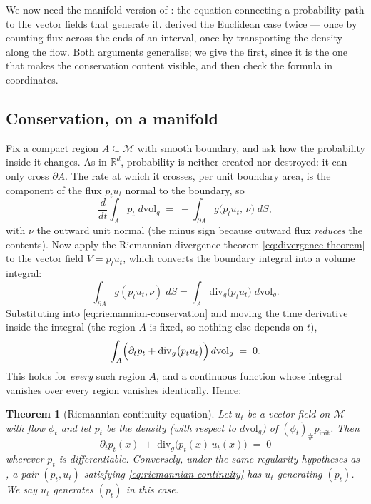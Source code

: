 \documentclass[11pt,a4paper]{report}
\newtheorem{theorem}{Theorem}[chapter]
\theoremstyle{definition}
\theoremstyle{remark}
\newcommand{\RR}{\mathbb R}
\begin{document}
We now need the manifold version of : the equation
connecting a probability path to the vector fields that generate it.
 derived the Euclidean case twice --- once by
counting flux across the ends of an interval, once by transporting the
density along the flow. Both arguments generalise; we give the first, since
it is the one that makes the conservation content visible, and then check
the formula in coordinates.

\subsection{Conservation, on a manifold}

Fix a compact region $A\subseteq\mathcal M$ with smooth boundary, and ask
how the probability inside it changes. As in $\RR^d$, probability is neither
created nor destroyed: it can only cross $\partial A$. The rate at which it
crosses, per unit boundary area, is the component of the flux $p_tu_t$
normal to the boundary, so
\begin{equation}
\label{eq:riemannian-conservation}
\frac{d}{dt}\int_A p_t\;d\mathrm{vol}_g
\;=\;
-\int_{\partial A}g\bigl(p_tu_t,\,\nu\bigr)\;dS ,
\end{equation}
with $\nu$ the outward unit normal (the minus sign because outward flux
\emph{reduces} the contents). Now apply the Riemannian divergence theorem
\eqref{eq:divergence-theorem} to the vector field $V=p_tu_t$, which converts
the boundary integral into a volume integral:
\[
\int_{\partial A}g(p_tu_t,\nu)\;dS = \int_A\mathrm{div}_g\bigl(p_tu_t\bigr)\;d\mathrm{vol}_g .
\]
Substituting into \eqref{eq:riemannian-conservation} and moving the time
derivative inside the integral (the region $A$ is fixed, so nothing else
depends on $t$),
\[
\int_A\Bigl(\partial_tp_t + \mathrm{div}_g\bigl(p_tu_t\bigr)\Bigr)\,d\mathrm{vol}_g \;=\; 0 .
\]
This holds for \emph{every} such region $A$, and a continuous function whose
integral vanishes over every region vanishes identically. Hence:

\begin{theorem}[Riemannian continuity equation]
\label{thm:riemannian-continuity}
Let $u_t$ be a vector field on $\mathcal M$ with flow $\phi_t$ and let
$p_t$ be the density (with respect to $d\mathrm{vol}_g$) of
$(\phi_t)_\#p_{\mathrm{init}}$. Then
\begin{equation}
\label{eq:riemannian-continuity}
\boxed{\;
\partial_tp_t(x) \;+\; \mathrm{div}_g\bigl(p_t(x)\,u_t(x)\bigr) \;=\; 0\;}
\end{equation}
wherever $p_t$ is differentiable. Conversely, under the same regularity
hypotheses as , a pair $(p_t,u_t)$ satisfying
\eqref{eq:riemannian-continuity} has $u_t$ generating $(p_t)$. We say $u_t$
\emph{generates} $(p_t)$ in this case.
\end{theorem}
\end{document}
